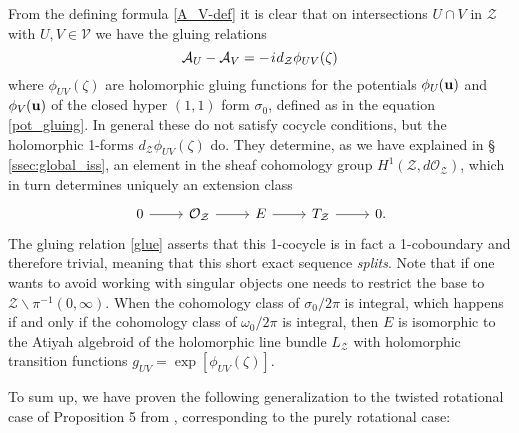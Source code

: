 \documentclass[11pt]{amsart}
\theoremstyle{remark}
\theoremstyle{remark}
\theoremstyle{definition}
\theoremstyle{definition}
\theoremstyle{definition}
\newcommand{\0}{{\scriptstyle 0'}} %
\newcommand{\1}{{\scriptstyle 1'}}
\newcommand{\pt}{\hspace{1pt}} %
\newcommand{\hp}{\hspace{0.5pt}} %
\newcommand{\nhp}{\hspace{-0.5pt}} %
\begin{document}
From the defining formula \eqref{A_V-def} it is clear that on intersections $U \cap V$ in $\mathcal{Z}$ with $U,V \in \mathscr{V}$ we have the gluing relations
\begin{equation} \label{glue}
\mathcal{A}_U - \mathcal{A}_V = - \pt i \hp d_{\mathcal{Z}} \phi_{UV}(\zeta)
\end{equation}
where $\phi_{UV}(\zeta)$ are holomorphic gluing functions for the potentials $\phi_U\nhp(\mathbf{u})$ and $\phi_V\nhp(\mathbf{u})$ of the closed hyper $(1,1)$ form $\sigma_0$, defined as in the equation \eqref{pot_gluing}. In general these do not satisfy cocycle conditions, but the holomorphic 1-forms $d_{\mathcal{Z}}\phi_{UV}(\zeta)$ do. They determine, as we have explained in \mbox{\S\,\ref{ssec:global_iss}}, an element in the sheaf cohomology group $H^1(\mathcal{Z},d\mathcal{O}_{\mathcal{Z}})$, which in turn determines uniquely an extension class
\begin{equation}
\begin{tikzcd}
0 \rar & \mathcal{O}_{\mathcal{Z}} \rar & E \rar & T_{\mathcal{Z}} \rar & 0 \mathrlap{.}
\end{tikzcd}
\end{equation}
The gluing relation \eqref{glue} asserts that this 1-cocycle is in fact a 1-coboundary and therefore trivial, meaning that this short exact sequence \textit{splits}. Note that if one wants to avoid working with singular objects one needs to restrict the base to $\mathcal{Z} \smallsetminus \pi^{-1}(0,\infty)$. When the  cohomology class of $\sigma_0/2\pi$ is integral, which happens if and only if the cohomology class of $\omega_0/2\pi$ is integral, then $E$ is isomorphic to the Atiyah algebroid of the holomorphic line bundle $L_{\mathcal{Z}}$ with holomorphic transition functions $g_{UV} = \exp[\phi_{UV}(\zeta)]$. 

To sum up, we have proven the following generalization to the twisted rotational case of Proposition 5 from \cite{MR3116317}, corresponding to the purely rotational case:
\end{document}
